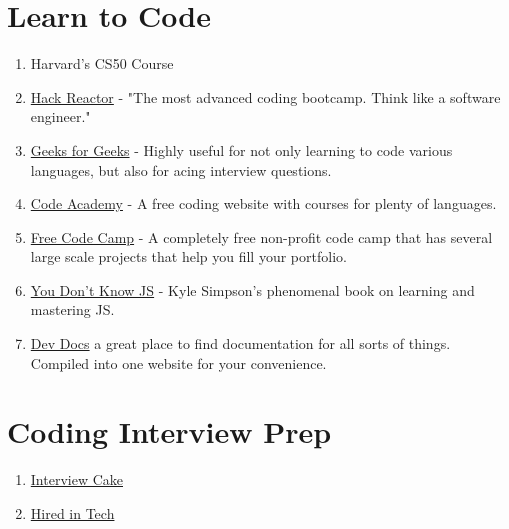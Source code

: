 
\section{Learn to Code}
\begin{enumerate}
    \item Harvard's CS50 Course
    \item \href{https://www.hackreactor.com/}{Hack Reactor} - "The most advanced coding bootcamp. Think like a software engineer."
    
    \item \href{https://www.geeksforgeeks.org/}{Geeks for Geeks} - Highly useful for not only learning to code various languages, but also for acing interview questions.
    
    \item \href{https://www.codecademy.com}{Code Academy} - A free coding website with courses for plenty of languages.
    
    \item \href{https://www.freecodecamp.org/}{Free Code Camp} - A completely free non-profit code camp that has several large scale projects that help you fill your portfolio.
    \item \href{https://github.com/getify/You-Dont-Know-JS}{You Don't Know JS} - Kyle Simpson's phenomenal book on learning and mastering JS.
    \item \href{https://devdocs.io/}{Dev Docs} a great place to find documentation for all sorts of things. Compiled into one website for your convenience.
\end{enumerate}


\section{Coding Interview Prep}
\begin{enumerate}
    \item \href{https://www.interviewcake.com/upgrade}{Interview Cake}
    \item \href{https://www.hiredintech.com/classrooms/system-design/lesson/60}{Hired in Tech}
\end{enumerate}

